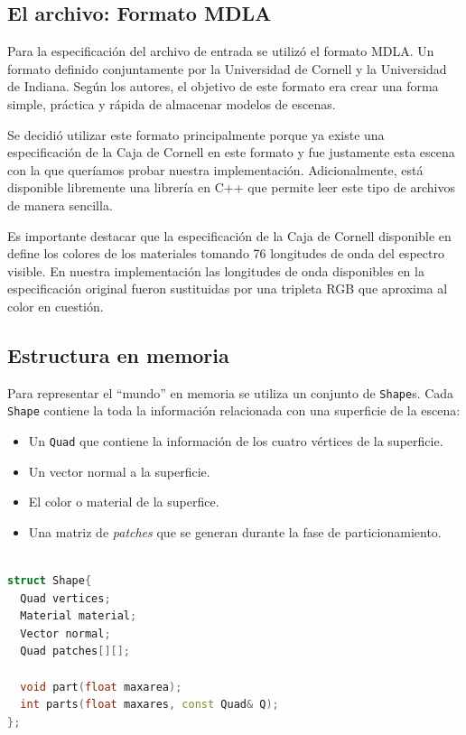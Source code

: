 \documentclass[letterpaper]{article}
\begin{document}
\subsection{El archivo: Formato MDLA}
\label{sec:mdla}
Para la especificación del archivo de entrada se utilizó el formato
MDLA\cite{mdla}. Un formato definido conjuntamente por la Universidad
de Cornell y la Universidad de Indiana. Según los autores, el objetivo
de este formato era crear una forma simple, práctica y rápida de
almacenar modelos de escenas.

Se decidió utilizar este formato principalmente porque ya existe una
especificación de la Caja de Cornell en este formato y fue justamente
esta escena con la que queríamos probar nuestra
implementación. Adicionalmente, está disponible libremente una
librería en C++ que permite leer este tipo de archivos de manera
sencilla.

Es importante destacar que la especificación de la Caja de Cornell
disponible en~\cite{cornellboxdata} define los colores de los
materiales tomando 76 longitudes de onda del espectro visible. En
nuestra implementación las longitudes de onda disponibles en la
especificación original fueron sustituidas por una tripleta RGB que
aproxima al color en cuestión.

\subsection{Estructura en memoria}
\label{sec:struct}
Para representar el ``mundo'' en memoria se utiliza un conjunto de
\texttt{Shape}s. Cada \texttt{Shape} contiene la toda la información
relacionada con una superficie de la escena:
\begin{itemize}
\item Un \texttt{Quad} que contiene la información de los cuatro
  vértices de la superficie.
\item Un vector normal a la superficie.
\item El color o material de la superfice.
\item Una matriz de \textsl{patches} que se generan durante la fase de
  particionamiento.
\end{itemize}

\begin{minipage}[c]{0.6\linewidth}
\begin{lstlisting}[language=C++,frame=single,caption=Representación básica del modelo]

struct Shape{
  Quad vertices;
  Material material;
  Vector normal;
  Quad patches[][];

  void part(float maxarea);
  int parts(float maxares, const Quad& Q);
};

\end{lstlisting}
\end{minipage}
\end{document}
